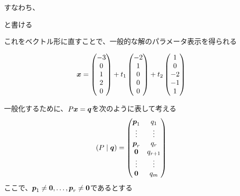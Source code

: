 \documentclass[../../../topic_linear-algebra]{subfiles}
\begin{document}
すなわち、

\begin{center}
\end{center}

と書ける

\br

これをベクトル形に直すことで、一般的な解のパラメータ表示を得られる

\begin{equation*}
  \vb*{x} = \begin{pmatrix}
    -3 \\
    0  \\
    1  \\
    2  \\
    0
  \end{pmatrix} + t_1 \begin{pmatrix}
    -2 \\
    1  \\
    0  \\
    0  \\
    0
  \end{pmatrix} + t_2 \begin{pmatrix}
    1  \\
    0  \\
    -2 \\
    -1 \\
    1
  \end{pmatrix}
\end{equation*}

\sectionline
{}


\br

一般化するために、$P\vb*{x} = \vb*{q}$を次のように表して考える
\begin{equation*}
  (P \mid \vb*{q}) = \begin{pmatrix}
    \vb*{p}_1 & q_1     \\
    \vdots    & \vdots  \\
    \vb*{p}_r & q_r     \\
    \vb*{0}   & q_{r+1} \\
    \vdots    & \vdots  \\
    \vb*{0}   & q_m
  \end{pmatrix}
\end{equation*}
ここで、$\vb*{p}_1 \neq \vb*{0}, \dots, \vb*{p}_r \neq \vb*{0}$であるとする
\end{document}
